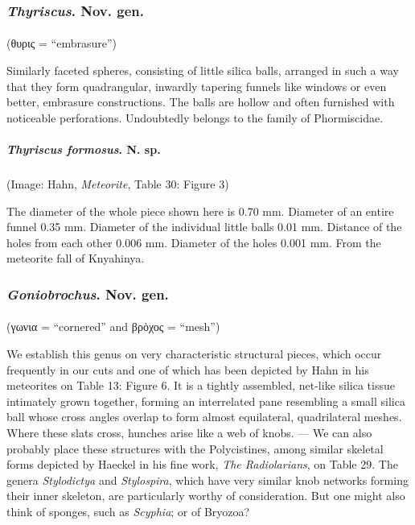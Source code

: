 \documentclass[a4paper, 12pt, oneside]{article}
\begin{document}
\subsubsection{\emph{Thyriscus}. Nov. gen.}
\paragraph*{}
(θυρις = ``embrasure'')%

Similarly faceted spheres, consisting of little silica balls, arranged in such a way that they form quadrangular, inwardly tapering funnels like windows or even better, embrasure constructions. The balls are hollow and often furnished with noticeable perforations. Undoubtedly belongs to the family of Phormiscidae.
\paragraph{\emph{Thyriscus formosus}. N. sp.}
\subparagraph{}
(Image: Hahn, \emph{Meteorite}, Table 30: Figure 3)

The diameter of the whole piece shown here is 0.70 mm. Diameter of an entire funnel 0.35 mm. Diameter of the individual little balls 0.01 mm. Distance of the holes from each other 0.006 mm. Diameter of the holes 0.001 mm. From the meteorite fall of Knyahinya.
\subsubsection{\emph{Goniobrochus}. Nov. gen.}
\paragraph*{}
(γωνια = ``cornered'' and βρὁχος = ``mesh'')%

We establish this genus on very characteristic structural pieces, which occur frequently in our cuts and one of which has been depicted by Hahn in his meteorites on Table 13: Figure 6. It is a tightly assembled, net-like silica tissue intimately grown together, forming an interrelated pane resembling a small silica ball whose cross angles overlap to form almost equilateral, quadrilateral meshes. Where these slats cross, hunches arise like a web of knobs. --- We can also probably place these structures with the Polycistines, among similar skeletal forms depicted by Haeckel in his fine work, \emph{The Radiolarians}, on Table 29. The genera \emph{Stylodictya} and \emph{Stylospira}, which have very similar knob networks forming their inner skeleton, are particularly worthy of consideration. But one might also think of sponges, such as \emph{Scyphia}; or of Bryozoa?
\end{document}
